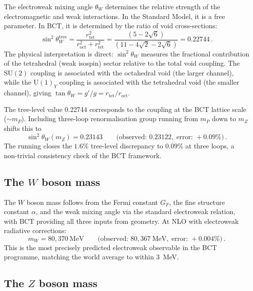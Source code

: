 \documentclass[review,number,sort&compress]{elsarticle}
\newcommand{\roct}{r_{\mathrm{oct}}}
\newcommand{\rtet}{r_{\mathrm{tet}}}
\begin{document}
The electroweak mixing angle $\theta_W$ determines the relative strength
of the electromagnetic and weak interactions. In the Standard Model, it
is a free parameter. In BCT, it is determined by the ratio of void
cross-sections:
\begin{equation}
  \sin^2\theta_W^{\mathrm{tree}} = \frac{\rtet^2}{\roct^2 + \rtet^2}
  = \frac{(5 - 2\sqrt{6})}{(11 - 4\sqrt{2} - 2\sqrt{6})}
  = 0.22744\,.
  \label{eq:sin2tw_tree}
\end{equation}
The physical interpretation is direct: $\sin^2\theta_W$ measures the
fractional contribution of the tetrahedral (weak isospin) sector relative
to the total void coupling. The $\mathrm{SU}(2)$ coupling is associated
with the octahedral void (the larger channel), while the $\mathrm{U}(1)_Y$
coupling is associated with the tetrahedral void (the smaller channel),
giving $\tan\theta_W = g'/g = \rtet/\roct$.

The tree-level value 0.22744 corresponds to the coupling at the BCT
lattice scale ($\sim m_P$). Including three-loop renormalisation group
running from $m_P$ down to $m_Z$ shifts this to
\begin{equation}
  \sin^2\theta_W(m_Z) = 0.23143 \qquad
  \bigl(\text{observed: } 0.23122,\;\text{error: } +0.09\%\bigr)\,.
  \label{eq:sin2tw_mZ}
\end{equation}
The running closes the $1.6\%$ tree-level discrepancy to $0.09\%$ at
three loops, a non-trivial consistency check of the BCT framework.

\subsection{The $W$ boson mass}

The $W$ boson mass follows from the Fermi constant $G_F$, the fine
structure constant $\alpha$, and the weak mixing angle via the
standard electroweak relation, with BCT providing all three inputs
from geometry. At NLO with electroweak radiative corrections:
\begin{equation}
  m_W = 80{,}370~\text{MeV} \qquad
  \bigl(\text{observed: } 80{,}367~\text{MeV},\;
  \text{error: } +0.004\%\bigr)\,.
  \label{eq:mW}
\end{equation}
This is the most precisely predicted electroweak observable in
the BCT programme, matching the world average to within 3~MeV.

\subsection{The $Z$ boson mass}
\end{document}
